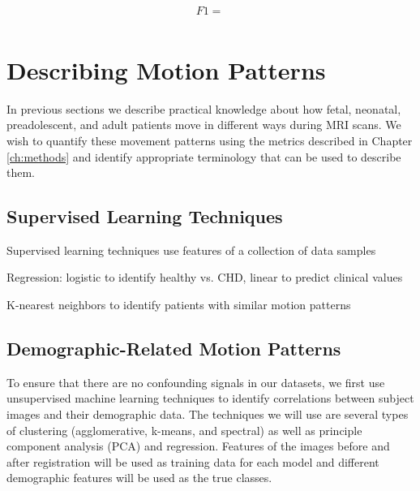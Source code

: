 \begin{equation}
F1 = \frac{}{}
\end{equation}

\section{Describing Motion Patterns}

In previous sections we describe practical knowledge about how fetal, neonatal, preadolescent, and adult patients move in different ways during MRI scans. We wish to quantify these movement patterns using the metrics described in Chapter \ref{ch:methods} and identify appropriate terminology that can be used to describe them.


\subsection{Supervised Learning Techniques}

Supervised learning techniques use features of a collection of data samples

Regression: logistic to identify healthy vs. CHD, linear to predict clinical values

K-nearest neighbors to identify patients with similar motion patterns







\subsection{Demographic-Related Motion Patterns} %


To ensure that there are no confounding signals in our datasets, we first use unsupervised machine learning techniques to identify correlations between subject images and their demographic data. The techniques we will use are several types of clustering (agglomerative, k-means, and spectral) as well as principle component analysis (PCA) and regression. Features of the images before and after registration will be used as training data for each model and different demographic features will be used as the true classes. %

